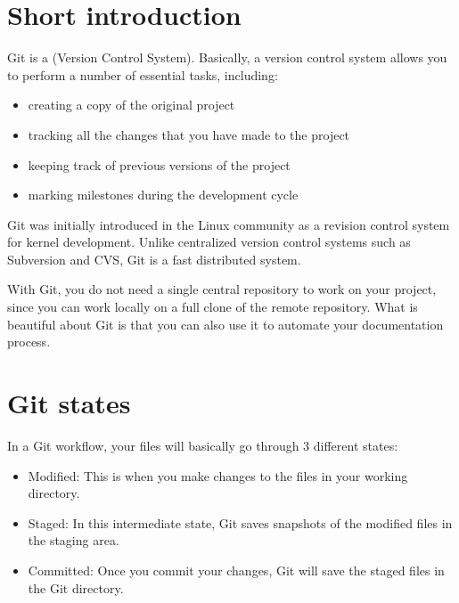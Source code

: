 \documentclass[a4paper,10pt,english,openany,oneside]{sphinxmanual}
\begin{document}
\section{Short introduction}
\label{\detokenize{gitinminutes:short-introduction}}
\sphinxAtStartPar
Git is a  (Version Control System). Basically, a version control system allows you to perform a number of essential tasks, including:
\begin{itemize}
\item {} 
\sphinxAtStartPar
creating a copy of the original project

\item {} 
\sphinxAtStartPar
tracking all the changes that you have made to the project

\item {} 
\sphinxAtStartPar
keeping track of previous versions of the project

\item {} 
\sphinxAtStartPar
marking milestones during the development cycle

\end{itemize}

\sphinxAtStartPar
Git was initially introduced in the Linux community as a revision control system for kernel development. Unlike centralized version control systems such as Subversion and CVS, Git is a fast distributed system.

\sphinxAtStartPar
With Git, you do not need a single central repository to work on your project, since you can work locally on a full clone of the remote repository. What is beautiful about Git is that you can also use it to automate your documentation process.


\section{Git states}
\label{\detokenize{gitinminutes:git-states}}
\sphinxAtStartPar
In a Git workflow, your files will basically go through 3 different states:
\begin{itemize}
\item {} 
\sphinxAtStartPar
Modified: This is when you make changes to the files in your working directory.

\item {} 
\sphinxAtStartPar
Staged: In this intermediate state, Git saves snapshots of the modified files in the staging area.

\item {} 
\sphinxAtStartPar
Committed: Once you commit your changes, Git will save the staged files in the Git directory.

\end{itemize}
\end{document}
